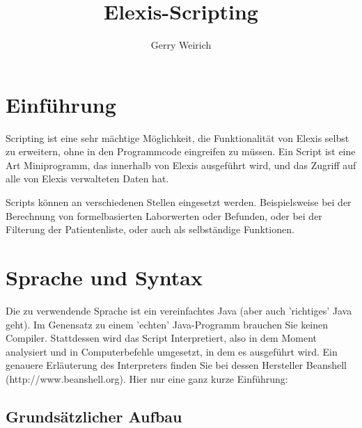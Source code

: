 \documentclass[a4paper]{scrartcl}
\begin{document}
\title{Elexis-Scripting}
\author{Gerry Weirich}
\maketitle

\section{Einführung}
Scripting ist eine sehr mächtige Möglichkeit, die Funktionalität von Elexis selbst zu erweitern, ohne in den Programmcode eingreifen zu müssen. Ein Script ist eine Art Miniprogramm, das innerhalb von Elexis ausgeführt wird, und das Zugriff auf alle von Elexis verwalteten Daten hat.

\medskip

Scripts können an verschiedenen Stellen eingesetzt werden. Beispielsweise bei der Berechnung von formelbasierten Laborwerten oder Befunden, oder bei der Filterung der Patientenliste, oder auch als selbständige Funktionen.

\section{Sprache und Syntax}
Die zu verwendende Sprache ist ein vereinfachtes Java (aber auch 'richtiges' Java geht). Im Genensatz zu einem 'echten' Java-Programm brauchen Sie keinen Compiler. Stattdessen wird das Script Interpretiert, also in dem Moment analysiert und in Computerbefehle umgesetzt, in dem es ausgeführt wird. Ein genauere Erläuterung des Interpreters finden Sie bei dessen Hersteller Beanshell (http://www.beanshell.org). Hier nur eine ganz kurze Einführung:

\subsection{Grundsätzlicher Aufbau}
\end{document}
